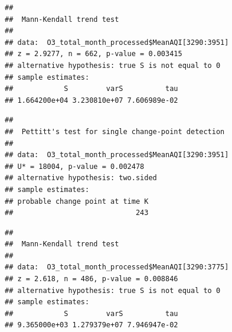 \documentclass[12pt,]{article}
\newenvironment{Shaded}{\begin{snugshade}}{\end{snugshade}}
\newcommand{\KeywordTok}[1]{\textcolor[rgb]{0.13,0.29,0.53}{\textbf{#1}}}
\newcommand{\DecValTok}[1]{\textcolor[rgb]{0.00,0.00,0.81}{#1}}
\newcommand{\CommentTok}[1]{\textcolor[rgb]{0.56,0.35,0.01}{\textit{#1}}}
\newcommand{\OperatorTok}[1]{\textcolor[rgb]{0.81,0.36,0.00}{\textbf{#1}}}
\newcommand{\NormalTok}[1]{#1}
\begin{document}
\begin{verbatim}
## 
##  Mann-Kendall trend test
## 
## data:  O3_total_month_processed$MeanAQI[3290:3951]
## z = 2.9277, n = 662, p-value = 0.003415
## alternative hypothesis: true S is not equal to 0
## sample estimates:
##            S         varS          tau 
## 1.664200e+04 3.230810e+07 7.606989e-02
\end{verbatim}

\begin{Shaded}
\end{Shaded}

\begin{verbatim}
## 
##  Pettitt's test for single change-point detection
## 
## data:  O3_total_month_processed$MeanAQI[3290:3951]
## U* = 18004, p-value = 0.002478
## alternative hypothesis: two.sided
## sample estimates:
## probable change point at time K 
##                             243
\end{verbatim}

\begin{Shaded}
\end{Shaded}

\begin{verbatim}
## 
##  Mann-Kendall trend test
## 
## data:  O3_total_month_processed$MeanAQI[3290:3775]
## z = 2.618, n = 486, p-value = 0.008846
## alternative hypothesis: true S is not equal to 0
## sample estimates:
##            S         varS          tau 
## 9.365000e+03 1.279379e+07 7.946947e-02
\end{verbatim}

\begin{Shaded}
\end{Shaded}
\end{document}
